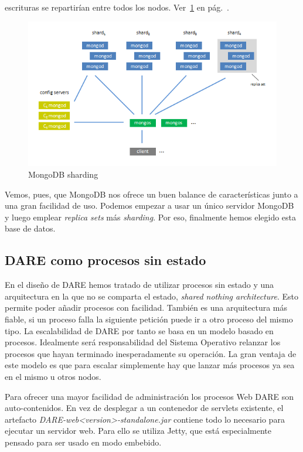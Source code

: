 \begin{description}
  escrituras se repartirían entre todos los nodos. Ver~\ref{sharding}
  en pág.~\pageref{sharding}.
  \begin{figure}[hbtp]
    \includegraphics[width=1\textwidth]{chapters/technical-manual/sharding.png}
    \caption{MongoDB sharding}\label{sharding}
  \end{figure}
\end{description}

Vemos, pues, que MongoDB nos ofrece un buen balance de características
junto a una gran facilidad de uso. Podemos empezar a usar un único
servidor MongoDB y luego emplear \emph{replica sets} más
\emph{sharding}. Por eso, finalmente hemos elegido esta base de datos.

\subsection{DARE como procesos sin estado}

En el diseño de DARE hemos tratado de utilizar procesos sin estado y
una arquitectura en la que no se comparta el estado, \emph{shared
  nothing architecture}. Esto permite poder añadir procesos con
facilidad. También es una arquitectura más fiable, si un proceso falla
la siguiente petición puede ir a otro proceso del mismo tipo. La
escalabilidad de DARE por tanto se basa en un modelo basado en
procesos. Idealmente será responsabilidad del Sistema Operativo
relanzar los procesos que hayan terminado inesperadamente su
operación. La gran ventaja de este modelo es que para escalar
simplemente hay que lanzar más procesos ya sea en el mismo u otros
nodos.

Para ofrecer una mayor facilidad de administración los procesos Web
DARE son auto-contenidos. En vez de desplegar a un contenedor de
servlets existente, el artefacto
\emph{DARE-web<version>-standalone.jar} contiene todo lo necesario
para ejecutar un servidor web. Para ello se utiliza Jetty, que está
especialmente pensado para ser usado en modo embebido.

